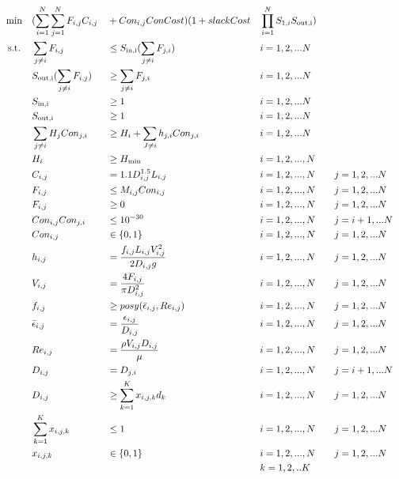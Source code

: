 \documentclass[12pt]{article}
\begin{document}
	\begin{equation}
	\begin{aligned}
	&\min &&(\sum_{i=1}^{N}\sum_{j=1}^{N} F_{i,j} C_{i,j} && + Con_{i,j} ConCost)(1 + slackCost &&\prod_{i=1}^{N}S_{1,i}S_{\rm{out},i})\\
	& \text{ s.t.} && \sum_{j \neq i} F_{i,j} && \leq S_{\rm{in},i}(\sum_{j \neq i} F_{j,i}) \quad && i = 1, 2, ... N\\
	& && S_{\rm{out},i}(\sum_{j \neq i} F_{i,j}) && \geq \sum_{j \neq i} F_{j,i} \quad && i = 1, 2, ... N\\
	& && S_{\rm{in},i} && \geq 1 \quad && i = 1, 2, ... N\\
	& && S_{\rm{out},i} && \geq 1 \quad && i = 1, 2, ... N\\
	& && \sum_{j \neq i} H_j Con_{j,i} && \geq H_i + \sum_{J \neq i} h_{j,i}Con_{j,i} && i = 1,2, ...N\\
	& && H_i && \geq H_{\rm{min}} && i = 1, 2, ..., N \\
	& && C_{i,j} && = 1.1 D_{i,j}^{1.5} L_{i,j} && i = 1, 2, ..., N \quad && j = 1, 2, ... N\\
	& && F_{i,j} && \leq M_{i,j} Con_{i,j} && i = 1, 2, ..., N \quad && j = 1, 2, ... N\\
	& && F_{i,j} && \geq 0 && i = 1, 2, ..., N \quad && j = 1, 2, ... N\\
	& && Con_{i,j}Con_{j,i} && \leq 10^{-30} && i = 1, 2, ..., N \quad && j = i+1, ... N\\
	& && Con_{i,j} &&\in \{0,1\} && i = 1, 2, ..., N \quad && j = 1, 2, ... N\\
	& && h_{i,j} && = \frac{f_{i,j} L_{i,j} V_{i,j}^2}{2D_{i,j} g} && i = 1, 2, ..., N \quad && j = 1, 2, ... N\\
	& && V_{i,j} && = \frac{4 F_{i,j}}{\pi D_{i,j}^2} && i = 1, 2, ..., N \quad && j = 1, 2, ... N\\
	& && f_{i,j} &&\geq posy(\bar{\epsilon}_{i,j}, Re_{i,j}) && i = 1, 2, ..., N \quad && j = 1, 2, ... N\\
	& && \bar{\epsilon}_{i,j} && = \frac{\epsilon_{i,j}}{D_{i,j}} && i = 1, 2, ..., N \quad && j = 1, 2, ... N\\
	& && Re_{i,j} && = \frac{\rho V_{i,j} D_{i,j}}{\mu} && i = 1, 2, ..., N \quad && j = 1, 2, ... N\\
	& && D_{i,j} && = D_{j,i} && i = 1, 2, ..., N \quad && j = i+1, ... N\\
	& && D_{i,j} && \geq \sum_{k=1}^{K}x_{i,j,k}d_k && i = 1, 2, ..., N \quad && j = 1, 2, ... N\\
	& && \sum_{k=1}^{K} x_{i,j,k} && \leq 1 && i = 1, 2, ..., N \quad && j = 1, 2, ... N\\
	& && x_{i,j,k} && \in \{0,1\} && i = 1, 2, ..., N \quad && j = 1, 2, ... N \\
	& && && && k = 1,2, ..K\\ 
	\end{aligned}
	\end{equation}
	
\end{document}
